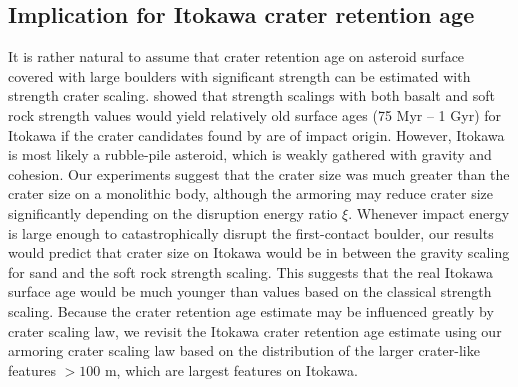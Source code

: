 \documentclass[3p,authoryear]{elsarticle}
\begin{document}
 \subsection{Implication for Itokawa crater retention age}\label{sec:itokawa-age}
It is rather natural to assume that crater retention age on asteroid surface covered with large boulders with significant strength can be estimated with strength crater scaling. \citet{michel2009} showed that strength scalings with both basalt and soft rock strength values would yield relatively old surface ages (75 Myr -- 1 Gyr) for Itokawa if the crater candidates found by \citet{hirata2009} are of impact origin.
 However, Itokawa is most likely a rubble-pile asteroid, which is weakly gathered with gravity and cohesion.
 Our experiments suggest that the crater size was much greater than the crater size on a monolithic body, although the armoring may reduce crater size significantly depending on the disruption energy ratio $\xi$.
 Whenever impact energy is large enough to catastrophically disrupt the first-contact boulder, our results would predict that crater size on Itokawa would be in between the gravity scaling for sand and the soft rock strength scaling. This suggests that the real Itokawa surface age would be much younger than values based on the classical strength scaling.
Because the crater retention age estimate may be influenced greatly by crater scaling law, we revisit the Itokawa crater retention age estimate using our armoring crater scaling law based on the distribution of the larger crater-like features $>100$ m, which are largest features on Itokawa.
\end{document}
